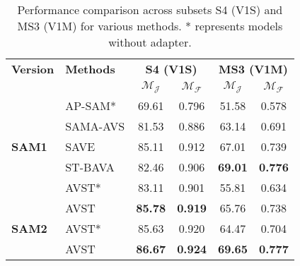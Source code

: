 
\begin{table}[h!]
\centering
\begin{tabular}{llcccc}
\toprule
\textbf{Version} & \textbf{Methods} & \multicolumn{2}{c}{\textbf{S4 (V1S)}} & \multicolumn{2}{c}{\textbf{MS3 (V1M)}} \\ 
\cmidrule(lr){3-4} \cmidrule(lr){5-6}
 & & $\mathcal{M}_{\mathcal{J}}$ & $\mathcal{M}_{\mathcal{F}}$ & $\mathcal{M}_{\mathcal{J}}$ & $\mathcal{M}_{\mathcal{F}}$ \\ 
\midrule
\multirow{5}{*}{\textbf{SAM1}} 
 & AP-SAM* & 69.61 & 0.796 & 51.58 & 0.578 \\  
 & SAMA-AVS & 81.53 & 0.886 & 63.14 & 0.691 \\
 & SAVE & 85.11 & 0.912 & 67.01 & 0.739 \\
 & ST-BAVA & 82.46&  0.906&  \textbf{69.01}&  \textbf{0.776} \\
 & AVST* & 83.11 & 0.901 & 55.81 & 0.634 \\
 & AVST & \textbf{85.78} & \textbf{0.919} & 65.76 & 0.738 \\
\midrule
 \multirow{1}{*}{\textbf{SAM2}} 
 & AVST* & 85.63& 0.920 & 64.47&  0.704\\
 & AVST & \textbf{86.67}&  \textbf{0.924}&  \textbf{69.65} &  \textbf{0.777}\\
\bottomrule
\end{tabular}
\caption{Performance comparison across subsets S4 (V1S) and MS3 (V1M) for various methods. * represents models without adapter.}
\label{tab:sam}
\end{table}
